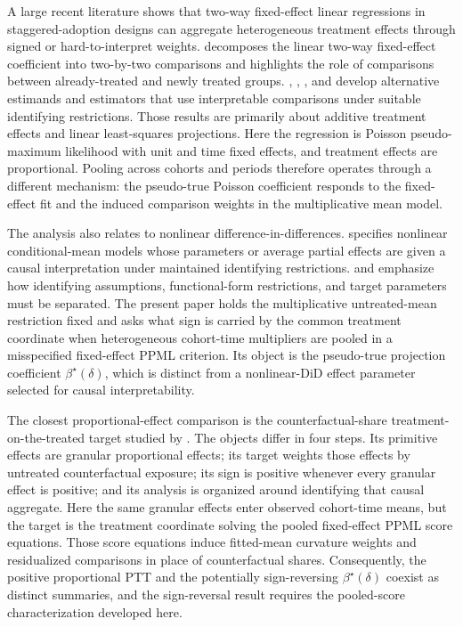 \documentclass[11pt]{article}
\begin{document}
A large recent literature shows that two-way fixed-effect linear regressions in staggered-adoption designs can aggregate heterogeneous treatment effects through signed or hard-to-interpret weights. \citet{GoodmanBacon2021} decomposes the linear two-way fixed-effect coefficient into two-by-two comparisons and highlights the role of comparisons between already-treated and newly treated groups. \citet{deChaisemartinDHaultfoeuille2020TWFE}, \citet{CallawaySantAnna2021}, \citet{SunAbraham2021}, and \citet{BorusyakJaravelSpiess2024} develop alternative estimands and estimators that use interpretable comparisons under suitable identifying restrictions. Those results are primarily about additive treatment effects and linear least-squares projections. Here the regression is Poisson pseudo-maximum likelihood with unit and time fixed effects, and treatment effects are proportional. Pooling across cohorts and periods therefore operates through a different mechanism: the pseudo-true Poisson coefficient responds to the fixed-effect fit and the induced comparison weights in the multiplicative mean model.

The analysis also relates to nonlinear difference-in-differences. \citet{Wooldridge2023NonlinearDiD} specifies nonlinear conditional-mean models whose parameters or average partial effects are given a causal interpretation under maintained identifying restrictions. \citet{RothSantAnna2023} and \citet{RothSantAnnaBilinskiPoe2023} emphasize how identifying assumptions, functional-form restrictions, and target parameters must be separated. The present paper holds the multiplicative untreated-mean restriction fixed and asks what sign is carried by the common treatment coordinate when heterogeneous cohort-time multipliers are pooled in a misspecified fixed-effect PPML criterion. Its object is the pseudo-true projection coefficient \(\beta^\star(\delta)\), which is distinct from a nonlinear-DiD effect parameter selected for causal interpretability.

The closest proportional-effect comparison is the counterfactual-share treatment-on-the-treated target studied by \citet{MoreauKastler2025PTT}. The objects differ in four steps. Its primitive effects are granular proportional effects; its target weights those effects by untreated counterfactual exposure; its sign is positive whenever every granular effect is positive; and its analysis is organized around identifying that causal aggregate. Here the same granular effects enter observed cohort-time means, but the target is the treatment coordinate solving the pooled fixed-effect PPML score equations. Those score equations induce fitted-mean curvature weights and residualized comparisons in place of counterfactual shares. Consequently, the positive proportional PTT and the potentially sign-reversing \(\beta^\star(\delta)\) coexist as distinct summaries, and the sign-reversal result requires the pooled-score characterization developed here.
\end{document}
